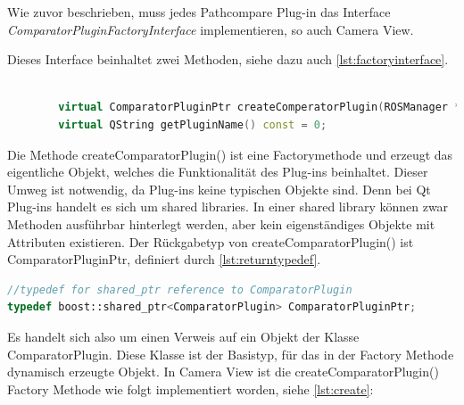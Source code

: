 Wie zuvor beschrieben, muss jedes Pathcompare Plug-in das Interface
\textit{ComparatorPluginFactoryInterface} implementieren, so auch Camera View.

Dieses Interface beinhaltet zwei Methoden, siehe dazu auch
\autoref{lst:factoryinterface}.

\begin{lstlisting}[caption=Interfacemethoden - Plug-ins müssen diese implementieren , language=C++, basicstyle=\footnotesize, label=lst:factoryinterface]

        virtual ComparatorPluginPtr createComperatorPlugin(ROSManager * ros_manager, QWidget *tab_widget) const = 0;
        virtual QString getPluginName() const = 0;

\end{lstlisting}

Die Methode createComparatorPlugin() ist eine Factorymethode und erzeugt das
eigentliche Objekt, welches die Funktionalität des Plug-ins beinhaltet. Dieser
Umweg ist notwendig, da Plug-ins keine typischen Objekte sind. Denn bei
Qt Plug-ins handelt es sich um shared libraries. In einer shared library können
zwar Methoden ausführbar hinterlegt werden, aber kein eigenständiges Objekte
mit Attributen existieren. Der Rückgabetyp von createComparatorPlugin() ist
ComparatorPluginPtr, definiert durch \autoref{lst:returntypedef}.

\begin{lstlisting}[caption=Typdefinition von CompoaratorPluginPtr, language=C++, basicstyle=\footnotesize, label=lst:returntypedef]
//typedef for shared_ptr reference to ComparatorPlugin
typedef boost::shared_ptr<ComparatorPlugin> ComparatorPluginPtr;
\end{lstlisting}

Es handelt sich also um einen Verweis auf ein Objekt der Klasse
ComparatorPlugin. Diese Klasse ist der Basistyp, für das in der Factory Methode
dynamisch erzeugte Objekt. In Camera View ist die createComparatorPlugin()
Factory Methode wie folgt implementiert worden, siehe \autoref{lst:create}:

